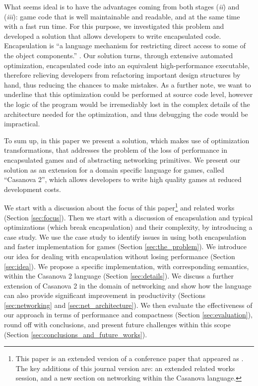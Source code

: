 What seems ideal is to have the advantages coming from both stages (\textit{ii}) and (\textit{iii}): game code that is well maintainable and readable, and at the same time with a fast run time. For this purpose, we investigated this problem and developed a solution that allows developers to write encapsulated code. Encapsulation is ``a language mechanism for restricting direct access to some of the object components.'' \cite{mitchell2003concepts}. Our solution turns, through extensive automated optimization, encapsulated code into an equivalent high-performance executable, therefore relieving developers from refactoring important design structures by hand, thus reducing the chances to make mistakes. As a further note, we want to underline that this optimization could be performed at source code level, however the logic of the program would be irremediably lost in the complex details of the architecture needed for the optimization, and thus debugging the code would be impractical.


To sum up, in this paper we present a solution, which makes use of optimization transformations, that addresses the problem of the loss of performance in encapsulated games and of abstracting networking primitives. We present our solution as an extension for a domain specific language for games, called ``Casanova 2'', which allows developers to write high quality games at reduced development costs. 

We start with a discussion about the focus of this paper\footnote{This paper is an extended version of a conference paper that appeared as \cite{abbadi2015high}. The key additions of this journal version are: an extended related works session, and a new section on networking within the Casanova language.} and related works (Section \ref{sec:focus}). Then we start with a discussion of encapsulation and typical optimizations (which break encapsulation) and their complexity, by introducing a case study. We use the case study to identify issues in using both encapsulation and faster implementation for games (Section \ref{sec:the_problem}). We introduce our idea for dealing with encapsulation without losing performance (Section \ref{sec:idea}). We propose a specific implementation, with corresponding semantics, within the Casanova 2 language (Section \ref{sec:details}). We discuss a further extension of Casanova 2 in the domain of networking and show how the language can also provide significant improvement in productivity (Sections \ref{sec:networking} and \ref{sec:net_architecture}). We then evaluate the effectiveness of our approach in terms of performance and compactness (Section \ref{sec:evaluation}), round off with conclusions, and present future challenges within this scope (Section \ref{sec:conclusions_and_future_works}).

